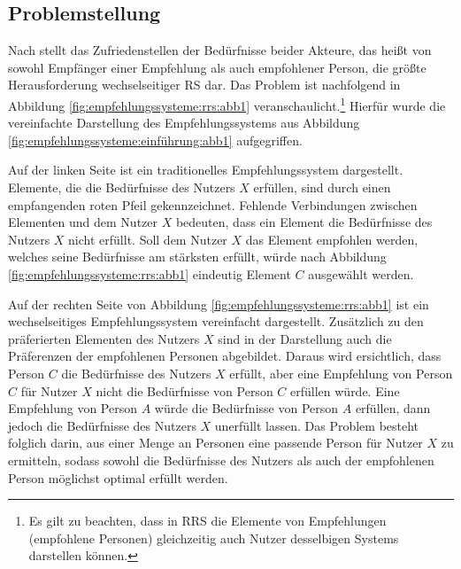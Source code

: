 \subsection{Problemstellung}\label{ch:empfehlungssyteme:rrs:problem}
Nach \textcite[S. 35]{li:inproceedings} stellt das Zufriedenstellen der Bedürfnisse beider Akteure, das heißt von sowohl Empfänger einer Empfehlung als auch empfohlener Person, die größte Herausforderung wechselseitiger \ac{RS} dar.
Das Problem ist nachfolgend in Abbildung \ref{fig:empfehlungssysteme:rrs:abb1} veranschaulicht.\footnote{Es gilt zu beachten, dass in \ac{RRS} die Elemente von Empfehlungen (empfohlene Personen) gleichzeitig auch Nutzer desselbigen Systems darstellen können.}
Hierfür wurde die vereinfachte Darstellung des Empfehlungssystems aus Abbildung \ref{fig:empfehlungssysteme:einführung:abb1} aufgegriffen.

Auf der linken Seite ist ein traditionelles Empfehlungssystem dargestellt.
Elemente, die die Bedürfnisse des Nutzers $X$ erfüllen, sind durch einen empfangenden roten Pfeil gekennzeichnet.
Fehlende Verbindungen zwischen Elementen und dem Nutzer $X$ bedeuten, dass ein Element die Bedürfnisse des Nutzers $X$ nicht erfüllt.
Soll dem Nutzer $X$ das Element empfohlen werden, welches seine Bedürfnisse am stärksten erfüllt, würde nach Abbildung \ref{fig:empfehlungssysteme:rrs:abb1} eindeutig Element $C$ ausgewählt werden.

Auf der rechten Seite von Abbildung \ref{fig:empfehlungssysteme:rrs:abb1} ist ein wechselseitiges Empfehlungssystem vereinfacht dargestellt.
Zusätzlich zu den präferierten Elementen des Nutzers $X$ sind in der Darstellung auch die Präferenzen der empfohlenen Personen abgebildet.
Daraus wird ersichtlich, dass Person $C$ die Bedürfnisse des Nutzers $X$ erfüllt, aber eine Empfehlung von Person $C$ für Nutzer $X$ nicht die Bedürfnisse von Person $C$ erfüllen würde.
Eine Empfehlung von Person $A$ würde die Bedürfnisse von Person $A$ erfüllen, dann jedoch die Bedürfnisse des Nutzers $X$ unerfüllt lassen.
Das Problem besteht folglich darin, aus einer Menge an Personen eine passende Person für Nutzer $X$ zu ermitteln, sodass sowohl die Bedürfnisse des Nutzers als auch der empfohlenen Person möglichst optimal erfüllt werden.

